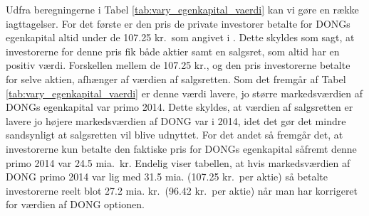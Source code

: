 \documentclass{article}
\begin{document}
Udfra beregningerne i Tabel \ref{tab:vary_egenkapital_vaerdi} kan vi gøre en række iagttagelser. For det første er den pris de private investorer betalte for DONGs egenkapital altid under de 107.25 kr.\ som angivet i \citep{FM2013a}. Dette skyldes som sagt, at investorerne for denne pris fik både aktier samt en salgsret, som altid har en positiv værdi. Forskellen mellem de 107.25 kr., og den pris investorerne betalte for selve aktien, afhænger af værdien af salgsretten. Som det fremgår af Tabel \ref{tab:vary_egenkapital_vaerdi} er denne værdi lavere, jo større markedsværdien af DONGs egenkapital var primo 2014. Dette skyldes, at værdien af salgsretten er lavere jo højere markedsværdien af DONG var i 2014, idet det gør det mindre sandsynligt at salgsretten vil blive udnyttet. For det andet så fremgår det, at investorerne kun betalte den faktiske pris for DONGs egenkapital såfremt denne primo 2014 var 24.5 mia.\ kr. Endelig viser tabellen, at hvis markedsværdien af DONG primo 2014 var lig med 31.5 mia. (107.25 kr.\ per aktie) så betalte investorerne reelt blot 27.2 mia. kr.\ (96.42 kr.\ per aktie) når man har korrigeret for værdien af DONG optionen.
\end{document}

